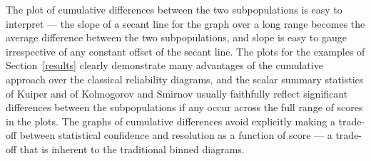 \documentclass{article}
\begin{document}
The plot of cumulative differences between the two subpopulations
is easy to interpret --- the slope of a secant line for the graph over
a long range becomes the average difference between the two subpopulations,
and slope is easy to gauge irrespective of any constant offset
of the secant line. The plots for the examples of Section~\ref{results}
clearly demonstrate many advantages of the cumulative approach
over the classical reliability diagrams, and the scalar summary statistics
of Kuiper and of Kolmogorov and Smirnov usually faithfully reflect
significant differences between the subpopulations if any occur
across the full range of scores in the plots.
The graphs of cumulative differences avoid explicitly making
a trade-off between statistical confidence and resolution as a function
of score --- a trade-off that is inherent to the traditional binned diagrams.





\end{document}
